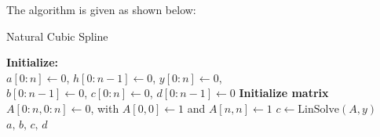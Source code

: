 The algorithm is given as shown below: 

\begin{algorithm}[H]
    \caption{Natural Cubic Spline}\label{alg:natural_cubic_spline}
    \BlankLine
    \textbf{Initialize:} \\
    $a[0:n] \gets 0$, $h[0:n-1] \gets 0$, $y[0:n] \gets 0$,\\
    $b[0:n-1] \gets 0$, $c[0:n] \gets 0$, $d[0:n-1] \gets 0$\;
    \BlankLine
    \BlankLine
    \textbf{Initialize matrix} $A[0:n, 0:n] \gets 0$, with $A[0,0] \gets 1$ and $A[n,n] \gets 1$\;
    \BlankLine
    $c \gets \text{LinSolve}(A,y)$\;
    \BlankLine
    \Return $a,\, b,\, c,\, d$\;
    \end{algorithm}